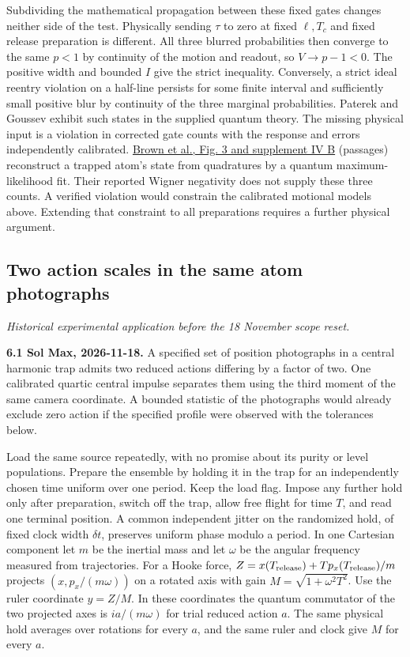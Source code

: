 \documentclass[11pt,a4paper]{article}
\begin{document}
Subdividing the mathematical propagation between these fixed gates
changes neither side of the test. Physically sending \(\tau\) to zero at
fixed \(\ell,T_c\) and fixed release preparation is different. All three
blurred probabilities then converge to the same \(p<1\) by continuity of
the motion and readout, so \(V\to p-1<0\). The positive width and
bounded \(I\) give the strict inequality. Conversely, a strict ideal
reentry violation on a half-line persists for some finite interval and
sufficiently small positive blur by continuity of the three marginal
probabilities. Paterek and Goussev exhibit such states in the supplied
quantum theory. The missing physical input is a violation in corrected
gate counts with the response and errors independently calibrated.
\href{https://arxiv.org/pdf/2203.03053\#page=4}{Brown et al., Fig. 3 and
supplement IV B} (passages) reconstruct a trapped atom's state from
quadratures by a quantum maximum-likelihood fit. Their reported Wigner
negativity does not supply these three counts. A verified violation
would constrain the calibrated motional models above. Extending that
constraint to all preparations requires a further physical argument.

\subsection{Two action scales in the same atom
photographs}\label{two-action-scales-in-the-same-atom-photographs}

\emph{Historical experimental application before the 18 November scope
reset.}

\textbf{6.1 Sol Max, 2026-11-18.} A specified set of position
photographs in a central harmonic trap admits two reduced actions
differing by a factor of two. One calibrated quartic central impulse
separates them using the third moment of the same camera coordinate. A
bounded statistic of the photographs would already exclude zero action
if the specified profile were observed with the tolerances below.

Load the same source repeatedly, with no promise about its purity or
level populations. Prepare the ensemble by holding it in the trap for an
independently chosen time uniform over one period. Keep the load flag.
Impose any further hold only after preparation, switch off the trap,
allow free flight for time \(T\), and read one terminal position. A
common independent jitter on the randomized hold, of fixed clock width
\(\delta t\), preserves uniform phase modulo a period. In one Cartesian
component let \(m\) be the inertial mass and let \(\omega\) be the
angular frequency measured from trajectories. For a Hooke force,
\(Z=x(T_{\rm release})+T p_x(T_{\rm release})/m\) projects
\((x,p_x/(m\omega))\) on a rotated axis with gain
\(M=\sqrt{1+\omega^2T^2}\). Use the ruler coordinate \(y=Z/M\). In these
coordinates the quantum commutator of the two projected axes is
\(ia/(m\omega)\) for trial reduced action \(a\). The same physical hold
averages over rotations for every \(a\), and the same ruler and clock
give \(M\) for every \(a\).
\end{document}

